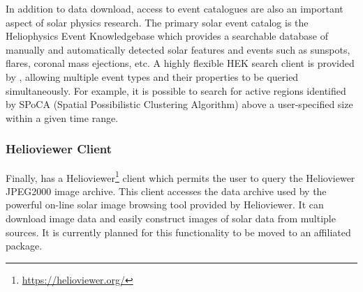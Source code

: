 In addition to data download, access to event catalogues are also an important aspect of solar physics research.
The primary solar event catalog is the Heliophysics Event Knowledgebase \citep[HEK,][]{hek} which provides a searchable database of manually and automatically detected solar features and events such as sunspots, flares, coronal mass ejections, etc. A highly flexible HEK search client is provided by \sunpypkg, allowing multiple event types and their properties to be queried simultaneously.
For example, it is possible to search for active regions identified by SPoCA (Spatial Possibilistic Clustering Algorithm) \citep{2014AA...561A..29V} above a user-specified size within a given time range.

\subsubsection{Helioviewer Client}
\label{sec:helioviewer}

Finally,  has a Helioviewer\footnote{\url{https://helioviewer.org/}} client which permits the user to query the Helioviewer JPEG2000 image archive.
This client accesses the data archive used by the powerful on-line solar image browsing tool provided by Helioviewer.
It can download image data and easily construct images of solar data from multiple sources.
It is currently planned for this functionality to be moved to an affiliated package.
